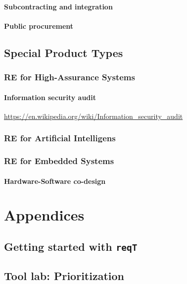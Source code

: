 \documentclass{reqengbook}
\begin{document}
\subsection{Subcontracting and integration}
\subsection{Public procurement}



\chapter{Special Product Types}

\section{RE for High-Assurance Systems}
\subsection{Information security audit}
\url{https://en.wikipedia.org/wiki/Information_security_audit}

\section{RE for Artificial Intelligens}

\section{RE for Embedded Systems}
\subsection{Hardware-Software co-design}

\part{Appendices}\appendix

\chapter{Getting started with \texttt{reqT}}

\chapter{Tool lab: Prioritization}
\end{document}
